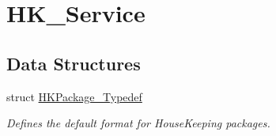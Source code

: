 \hypertarget{group___h_k___service}{}\section{H\+K\+\_\+\+Service}
\label{group___h_k___service}
\subsection*{Data Structures}
\begin{DoxyCompactItemize}
\item 
struct \hyperlink{struct_h_k_package___typedef}{H\+K\+Package\+\_\+\+Typedef}
\begin{DoxyCompactList}\small\item\em Defines the default format for House\+Keeping packages. \end{DoxyCompactList}\end{DoxyCompactItemize}
